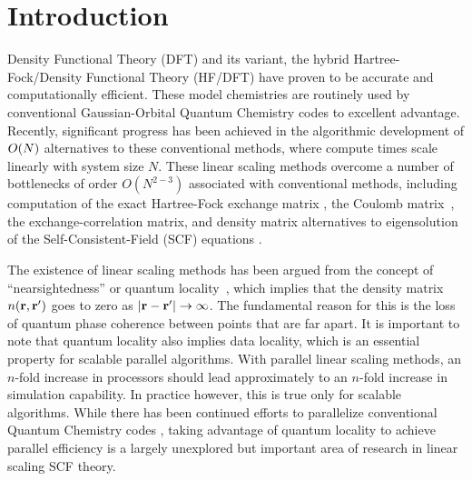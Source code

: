 \commentoutA{\documentclass[prl,aps,twocolumn,showpacs,twocolumngrid,superbib]{revtex4}}
\begin{document}


\maketitle


\section{Introduction}
\label{sec:intro}
Density Functional Theory (DFT) and its variant, the hybrid
Hartree-Fock/Density Functional Theory (HF/DFT) have proven to be
accurate and computationally efficient.  These model chemistries are
routinely used by conventional Gaussian-Orbital Quantum Chemistry
codes to excellent advantage.  Recently, significant progress has been
achieved in the algorithmic development of ${\cal }O(N)$ alternatives
to these conventional methods, where compute times scale linearly with
system size $N$\cite{Goedecker99,SWu02}.  These linear scaling methods
overcome a number of bottlenecks of order $O(N^{2-3})$ associated with
conventional methods, including computation of the exact Hartree-Fock
exchange matrix
\cite{ESchwegler96,ESchwegler97,ESchwegler98A,ESchwegler98C,ESchwegler99,ESchwegler00}, 
the Coulomb
matrix~\cite{CWhite94B,CWhite96A,MChallacombe96,MChallacombe96B,MStrain96,MChallacombe97},
the exchange-correlation
matrix\cite{Jorda95,RStratmann96,CGuerra98,MChallacombe00A}, and
density matrix alternatives to eigensolution of the
Self-Consistent-Field (SCF) equations
\cite{XLi93,MDaw93,SQiu94,EHernandez95B,Hernandez96,CMGoringe97,ADaniels97,DBowler99B,APalser99,MChallacombe99,ANiklasson02A,ANiklasson02B}.

The existence of linear scaling methods has been argued from the
concept of ``nearsightedness'' or quantum
locality~\cite{WKohn95,WKohn96}, which implies that the density matrix
$n({\bf r},{\bf r'})$ goes to zero as $|{\bf r}-{\bf r}'| \rightarrow
\infty$. The fundamental reason for this is the loss of quantum phase
coherence between points that are far apart.  It is important to note
that quantum locality also implies data locality, which is an
essential property for scalable parallel algorithms.  With parallel
linear scaling methods, an $n$-fold increase in processors should lead
approximately to an $n$-fold increase in simulation capability.  In
practice however, this is true only for scalable algorithms.  While
there has been continued efforts to parallelize conventional Quantum
Chemistry codes
\cite{Harrison_94v45,Guerra_95,Sosa_98v19,Stephan_98v108,Furlani_00v128,Sosa_00v26,Yoshihiro_01v346,Baker_02v23,HTakashima02},
taking advantage of quantum locality to achieve parallel efficiency is
a largely unexplored but important area of research in linear scaling
SCF theory.
\end{document}
